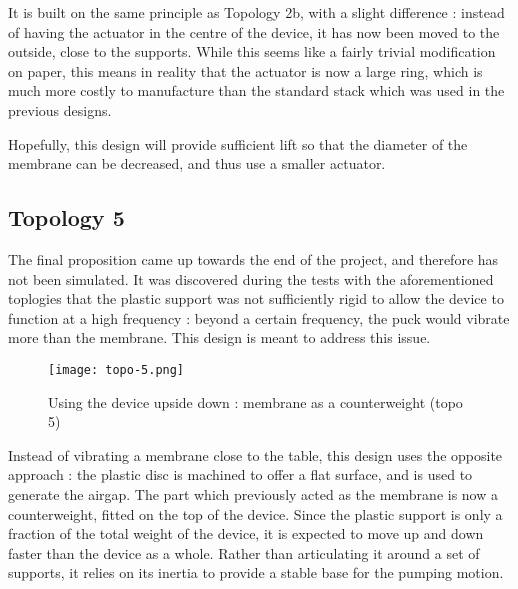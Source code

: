 It is built on the same principle as Topology 2b, with a slight difference :
instead of having the actuator in the centre of the device, it has now been
moved to the outside, close to the supports. While this seems like a fairly
trivial modification on paper, this means in reality that the actuator is now a
large ring, which is much more costly to manufacture than the standard stack
which was used in the previous designs.

Hopefully, this design will provide sufficient lift so that the diameter of the
membrane can be decreased, and thus use a smaller actuator.


\subsection{Topology 5}

The final proposition came up towards the end of the project, and therefore has
not been simulated. It was discovered during the tests with the aforementioned
toplogies that the plastic support was not sufficiently rigid to allow the
device to function at a high frequency : beyond a certain frequency, the puck
would vibrate more than the membrane. This design is meant to address this
issue.

\begin{figure}[h]
  \begin{center}
    \texttt{[image: topo-5.png]}
  \end{center}
  \caption{Using the device upside down : membrane as a counterweight (topo 5)}
  \label{fig:topo-5}
\end{figure}

Instead of vibrating a membrane close to the table, this design uses the
opposite approach : the plastic disc is machined to offer a flat surface, and is
used to generate the airgap. The part which previously acted as the membrane is
now a counterweight, fitted on the top of the device. Since the plastic support
is only a fraction of the total weight of the device, it is expected to move up
and down faster than the device as a whole. Rather than articulating it around
a set of supports, it relies on its inertia to provide a stable base for the
pumping motion.
